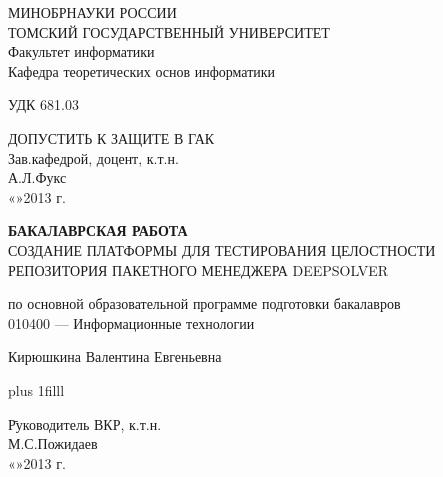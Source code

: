 \normalsize
\thispagestyle{empty}
\begin{center}
МИНОБРНАУКИ РОССИИ\\
ТОМСКИЙ ГОСУДАРСТВЕННЫЙ УНИВЕРСИТЕТ\\
Факультет информатики\\
Кафедра теоретических основ информатики\\
\end{center}

\vspace{0.7cm}

УДК 681.03

\vspace{0.5cm}

\begin{flushright}
ДОПУСТИТЬ К ЗАЩИТЕ В ГАК\\
Зав.кафедрой, доцент, к.т.н.\\
\makebox[3cm]{\hrulefill}А.Л.Фукс\\
«\makebox[0.8cm]{\hrulefill}»\makebox[1.5cm]{\hrulefill}2013 г.\\
\end{flushright}



\begin{center}

\vspace{1.5cm}
{\bf БАКАЛАВРСКАЯ РАБОТА}\\
\vspace{0.5cm}
СОЗДАНИЕ ПЛАТФОРМЫ ДЛЯ ТЕСТИРОВАНИЯ ЦЕЛОСТНОСТИ РЕПОЗИТОРИЯ ПАКЕТНОГО МЕНЕДЖЕРА DEEPSOLVER

\vspace{0.5cm}
по основной образовательной программе подготовки бакалавров\\
010400 --- Информационные технологии

\vspace{0.5cm}

Кирюшкина Валентина Евгеньевна


\end{center}

\vskip 0pt plus 1filll

\begin{tabbing}
\hspace{10cm}\=Руководитель ВКР, к.т.н.\\
\>\makebox[3cm]{\hrulefill}М.С.Пожидаев\\
\>«\makebox[0.8cm]{\hrulefill}»\makebox[1.5cm]{\hrulefill}2013 г.\\
\end{tabbing}

